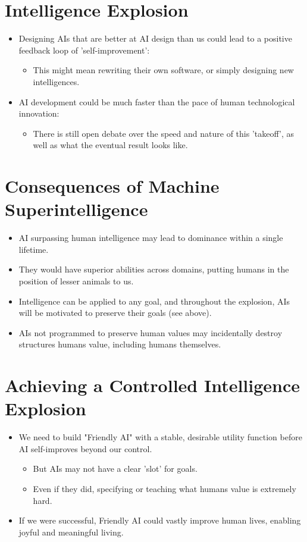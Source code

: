 \documentclass{article}
\begin{document}
\begin{multicols}{2}
\section{Intelligence Explosion}
\begin{itemize}
    \item Designing AIs that are better at AI design than us could lead to a positive feedback loop of 'self-improvement':
    \begin{itemize}
        \item This might mean rewriting their own software, or simply designing new intelligences.
    \end{itemize}
    \item AI development could be much faster than the pace of human technological innovation:
    \begin{itemize}
        \item There is still open debate over the speed and nature of this 'takeoff', as well as what the eventual result looks like.
    \end{itemize}
\end{itemize}

\section{Consequences of Machine Superintelligence}
\begin{itemize}
    \item AI surpassing human intelligence may lead to dominance within a single lifetime.
    \item They would have superior abilities across domains, putting humans in the position of lesser animals to us.
    \item Intelligence can be applied to any goal, and throughout the explosion, AIs will be motivated to preserve their goals (see above).
    \item AIs not programmed to preserve human values may incidentally destroy structures humans value, including humans themselves.
\end{itemize}

\section{Achieving a Controlled Intelligence Explosion}
\begin{itemize}
    \item We need to build "Friendly AI" with a stable, desirable utility function before AI self-improves beyond our control.
    \begin{itemize}
        \item But AIs may not have a clear 'slot' for goals.
        \item Even if they did, specifying or teaching what humans value is extremely hard.
    \end{itemize}
    \item If we were successful, Friendly AI could vastly improve human lives, enabling joyful and meaningful living.
\end{itemize}


\end{multicols}
\end{document}
